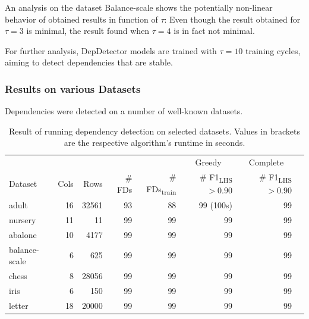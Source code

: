 An analysis on the dataset Balance-scale shows the potentially non-linear behavior of obtained results in function of \( \tau \):
Even though the result obtained for \( \tau = 3 \) is minimal, the result found when \( \tau = 4 \) is in fact not minimal.

For further analysis, DepDetector models are trained with \( \tau = 10 \) training cycles, aiming to detect dependencies that are stable.

\subsubsection{Results on various Datasets}
Dependencies were detected on a number of well-known datasets.
\begin{table}[ht]
    \centering
    \begin{tabular}{lrrrrrrr}
        \toprule
        \toprule
        & & & & & \multicolumn{1}{c}{Greedy} & \multicolumn{1}{c}{Complete} \\
        Dataset & Cols & Rows & \# FDs & \# FDs\textsubscript{train} & \# F1\textsubscript{LHS} $> 0.90$ & \# F1\textsubscript{LHS} $> 0.90$ \\
        \midrule
        adult & 16 & 32561 & 93 & 88 & 99 (100s)& 99 \\
        nursery & 11 & 11 & 99 & 99 & 99 & 99 \\
        abalone & 10 & 4177 & 99 & 99 & 99 & 99 \\
        balance-scale & 6 & 625 & 99 & 99 & 99 & 99 \\
        chess & 8 & 28056 & 99 & 99 & 99 & 99 \\
        iris & 6 & 150 & 99 & 99 & 99 & 99 \\
        letter & 18 & 20000 & 99 & 99 & 99 & 99 \\
        \bottomrule
        \bottomrule
    \end{tabular}
    \caption{Result of running dependency detection on selected datasets. Values in brackets are the respective algorithm's runtime in seconds.}\label{tab:dep-detection-performance}
\end{table}
